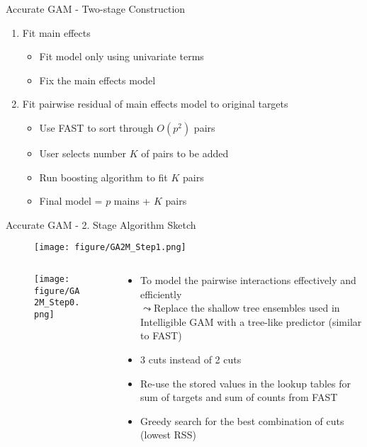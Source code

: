 \documentclass[10pt,compress,t,notes=noshow, xcolor=table]{beamer}
\begin{document}
\begin{frame}{Accurate GAM - Two-stage Construction}
\begin{enumerate}
    \item Fit main effects
    \begin{itemize}
        \item Fit model only using univariate terms
        \item Fix the main effects model
    \end{itemize}
    \item Fit pairwise residual of main effects model to original targets
    \begin{itemize}
        \item Use FAST to sort through $O(p^2)$ pairs
        \item User selects number $K$ of pairs to be added
        \item Run boosting algorithm to fit $K$ pairs
        \item Final model = $p$ mains + $K$ pairs
    \end{itemize}
\end{enumerate}
\end{frame}

\begin{frame}{Accurate GAM - 2. Stage Algorithm Sketch}
\begin{figure}
    \centering
    \texttt{[image: figure/GA2M\_Step1.png]}
    \label{fig:GA2M_Step1}
\end{figure}
\begin{columns}[T, totalwidth=\textwidth]
    \begin{column}{0.4\textwidth} 
        \begin{figure}
            \vspace{-1.35cm} 
            \hspace{-0.8cm} 
            \texttt{[image: figure/GA2M\_Step0.png]}
            \label{fig:GA2M_predictor}
        \end{figure}
    \end{column}
    \hfill
    \begin{column}{0.7\textwidth}
        \begin{itemize}
            \setlength{\leftskip}{-0.7cm}
            \vspace{-0.8cm}
            \item To model the pairwise interactions effectively and efficiently\\
            $\leadsto$Replace the shallow tree ensembles used in Intelligible GAM with a tree-like predictor (similar to FAST)
            \item 3 cuts instead of 2 cuts
            \item Re-use the stored values in the lookup tables for sum of targets and sum of counts from FAST
            \item Greedy search for the best combination of cuts (lowest RSS)
        \end{itemize}
    \end{column}
\end{columns}

\end{frame}
\end{document}
